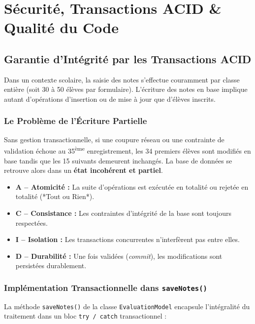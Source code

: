 \documentclass[11pt,a4paper,oneside]{report}
\begin{document}
\chapter{Sécurité, Transactions ACID \& Qualité du Code}
\label{chap:securite}

\section{Garantie d'Intégrité par les Transactions ACID}

Dans un contexte scolaire, la saisie des notes s'effectue couramment par classe entière (soit 30 à 50 élèves par formulaire). L'écriture des notes en base implique autant d'opérations d'insertion ou de mise à jour que d'élèves inscrits.

\subsection{Le Problème de l'Écriture Partielle}
Sans gestion transactionnelle, si une coupure réseau ou une contrainte de validation échoue au 35\textsuperscript{ème} enregistrement, les 34 premiers élèves sont modifiés en base tandis que les 15 suivants demeurent inchangés. La base de données se retrouve alors dans un \textbf{état incohérent et partiel}.

\begin{conceptBox}
\begin{itemize}[label=\textcolor{primaryMed}{\textbullet}]
    \item \textbf{A -- Atomicité :} La suite d'opérations est exécutée en totalité ou rejetée en totalité (*Tout ou Rien*).
    \item \textbf{C -- Consistance :} Les contraintes d'intégrité de la base sont toujours respectées.
    \item \textbf{I -- Isolation :} Les transactions concurrentes n'interfèrent pas entre elles.
    \item \textbf{D -- Durabilité :} Une fois validées (\textit{commit}), les modifications sont persistées durablement.
\end{itemize}
\end{conceptBox}

\subsection{Implémentation Transactionnelle dans \texttt{saveNotes()}}
La méthode \texttt{saveNotes()} de la classe \texttt{EvaluationModel} encapsule l'intégralité du traitement dans un bloc \texttt{try / catch} transactionnel :
\end{document}
